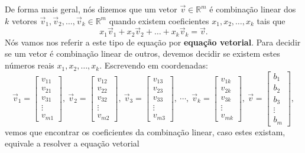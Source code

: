 De forma mais geral, nós dizemos que um vetor $\vec{v} \in \mathbb{R}^m$ é combinação linear dos $k$ vetores $\vec{v}_1, \vec{v}_2, \dots, \vec{v}_k  \in \mathbb{R}^m$ quando existem coeficientes $x_1, x_2, \dots, x_k$ tais que
\begin{equation}
x_1 \vec{v}_1 + x_2 \vec{v}_2 + \dots + x_k \vec{v}_k = \vec{v}.
\end{equation} Nós vamos nos referir a este tipo de equação por \textbf{equação vetorial}. Para decidir se um vetor é combinação linear de outros, devemos decidir se existem estes números reais $x_1, x_2, \dots, x_k$. Escrevendo em coordenadas:
\begin{equation}
\vec{v}_1 =
\left[
\begin{array}{c}
v_{11} \\
v_{21} \\
v_{31} \\
\vdots \\
v_{m1}
\end{array}
\right], \
\vec{v}_2 =
\left[
\begin{array}{c}
v_{12} \\
v_{22} \\
v_{32} \\
\vdots \\
v_{m2}
\end{array}
\right], \
\vec{v}_3 =
\left[
\begin{array}{c}
v_{13} \\
v_{23} \\
v_{33} \\
\vdots \\
v_{m3}
\end{array}
\right], \ \cdots, \
\vec{v}_k =
\left[
\begin{array}{c}
v_{1k} \\
v_{2k} \\
v_{3k} \\
\vdots \\
v_{mk}
\end{array}
\right], \
\vec{v} =
\left[
\begin{array}{c}
b_{1} \\
b_{2} \\
b_{3} \\
\vdots \\
b_{m}
\end{array}
\right],
\end{equation} vemos que encontrar os coeficientes da combinação linear, caso estes existam, equivale a resolver a equação vetorial
